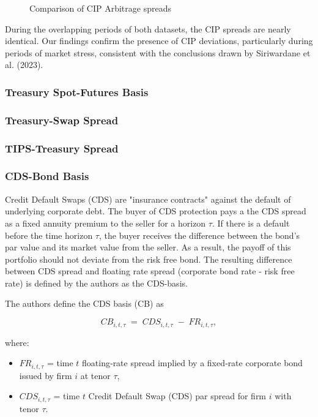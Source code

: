 \documentclass{article}
\begin{document}
\begin{appendices}
\begin{figure}
  \caption{Comparison of CIP Arbitrage spreads}
  \label{fig:cip_comparison}
\end{figure}

\FloatBarrier


During the overlapping periods of both datasets, the CIP spreads are nearly identical.
Our findings confirm the presence of CIP deviations, particularly during periods of
market stress, consistent with the conclusions drawn by Siriwardane et al. (2023).


\subsubsection{Treasury Spot-Futures Basis}

\subsubsection{Treasury-Swap Spread}

\subsubsection{TIPS-Treasury Spread}

\subsubsection{CDS-Bond Basis}

Credit Default Swaps (CDS) are "insurance contracts" against the default of underlying
corporate debt. The buyer of CDS protection pays a the CDS spread as a 
fixed annuity premium to the seller for a horizon $\tau$. If there is a default
before the time horizon $\tau$, the buyer receives the difference between
the bond's par value and its market value from the seller. 
As a result, the payoff of this portfolio should not deviate from the risk free bond. 
The resulting difference between CDS spread and floating rate spread (corporate bond rate - risk free rate)
is defined by the authors as the CDS-basis.

The authors define the CDS basis (CB) as

\begin{equation}
  CB_{i,t,\tau} \;=\; CDS_{i,t,\tau} \;-\; FR_{i,t,\tau},
\end{equation}

where:
\begin{itemize}
  \item $FR_{i,t,\tau}$ = time $t$ floating‐rate spread implied by a fixed‐rate corporate bond issued by firm $i$ at tenor $\tau$,
  \item $CDS_{i,t,\tau}$ = time $t$ Credit Default Swap (CDS) par spread for firm $i$ with tenor $\tau$.
\end{itemize}


\end{appendices}
\end{document}
